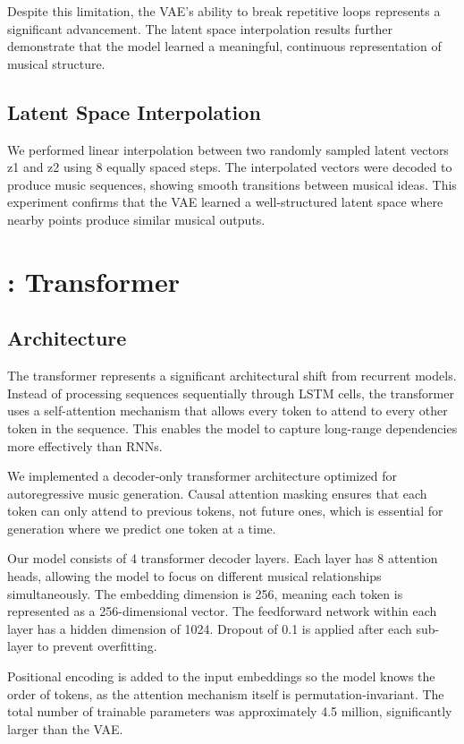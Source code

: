\documentclass{article}
\theoremstyle{plain}
\theoremstyle{definition}
\theoremstyle{remark}
\begin{document}
Despite this limitation, the VAE's ability to break repetitive loops represents a significant advancement. The latent space interpolation results further demonstrate that the model learned a meaningful, continuous representation of musical structure.

\subsection{Latent Space Interpolation}

We performed linear interpolation between two randomly sampled latent vectors z1 and z2 using 8 equally spaced steps. The interpolated vectors were decoded to produce music sequences, showing smooth transitions between musical ideas. This experiment confirms that the VAE learned a well-structured latent space where nearby points produce similar musical outputs.



\section{: Transformer}

\subsection{Architecture}

The transformer represents a significant architectural shift from recurrent models. Instead of processing sequences sequentially through LSTM cells, the transformer uses a self-attention mechanism that allows every token to attend to every other token in the sequence. This enables the model to capture long-range dependencies more effectively than RNNs.

We implemented a decoder-only transformer architecture optimized for autoregressive music generation. Causal attention masking ensures that each token can only attend to previous tokens, not future ones, which is essential for generation where we predict one token at a time.

Our model consists of 4 transformer decoder layers. Each layer has 8 attention heads, allowing the model to focus on different musical relationships simultaneously. The embedding dimension is 256, meaning each token is represented as a 256-dimensional vector. The feedforward network within each layer has a hidden dimension of 1024. Dropout of 0.1 is applied after each sub-layer to prevent overfitting.

Positional encoding is added to the input embeddings so the model knows the order of tokens, as the attention mechanism itself is permutation-invariant. The total number of trainable parameters was approximately 4.5 million, significantly larger than the VAE.
\end{document}
